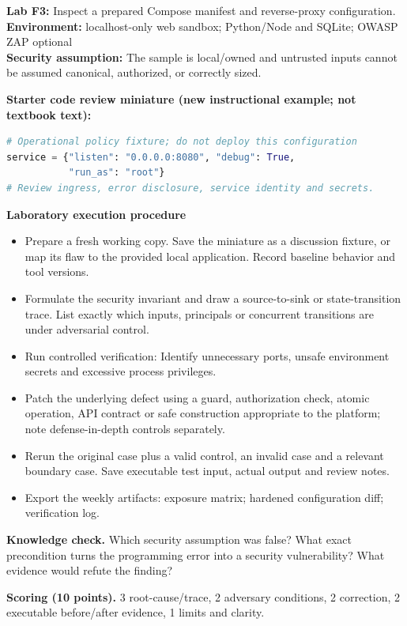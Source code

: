 \documentclass[10pt,letterpaper]{article}
\begin{document}
\begin{insight}\textbf{Lab F3:} Inspect a prepared Compose manifest and reverse-proxy configuration.\\\textbf{Environment:} localhost-only web sandbox; Python/Node and SQLite; OWASP ZAP optional\\\textbf{Security assumption:} The sample is local/owned and untrusted inputs cannot be assumed canonical, authorized, or correctly sized.\end{insight}
\textbf{Starter code review miniature (new instructional example; not textbook text):}
\begin{lstlisting}[language=Python]
# Operational policy fixture; do not deploy this configuration
service = {"listen": "0.0.0.0:8080", "debug": True,
           "run_as": "root"}
# Review ingress, error disclosure, service identity and secrets.
\end{lstlisting}
\textbf{Laboratory execution procedure}
\begin{itemize}[leftmargin=*,itemsep=2pt]
\item Prepare a fresh working copy. Save the miniature as a discussion fixture, or map its flaw to the provided local application. Record baseline behavior and tool versions.
\item Formulate the security invariant and draw a source-to-sink or state-transition trace. List exactly which inputs, principals or concurrent transitions are under adversarial control.
\item Run controlled verification: Identify unnecessary ports, unsafe environment secrets and excessive process privileges.
\item Patch the underlying defect using a guard, authorization check, atomic operation, API contract or safe construction appropriate to the platform; note defense-in-depth controls separately.
\item Rerun the original case plus a valid control, an invalid case and a relevant boundary case. Save executable test input, actual output and review notes.
\item Export the weekly artifacts: exposure matrix; hardened configuration diff; verification log.
\end{itemize}
\textbf{Knowledge check.} Which security assumption was false? What exact precondition turns the programming error into a security vulnerability? What evidence would refute the finding?

\textbf{Scoring (10 points).} 3 root-cause/trace, 2 adversary conditions, 2 correction, 2 executable before/after evidence, 1 limits and clarity.
\end{document}
